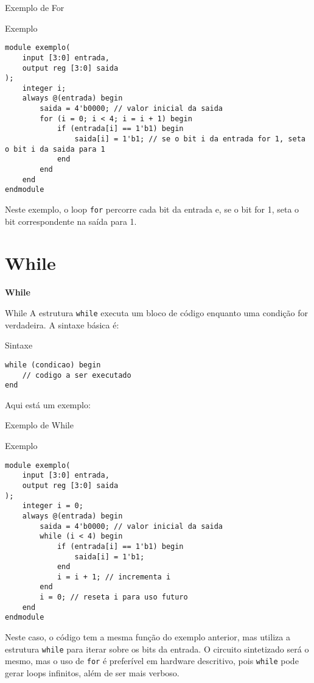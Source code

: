 \documentclass[aspectratio=169,xcolor=dvipsnames]{beamer}
\begin{document}
\begin{frame}[fragile]{Exemplo de For}
\begin{block}{Exemplo}
\begin{verbatim}
module exemplo(
    input [3:0] entrada,
    output reg [3:0] saida
);
    integer i;
    always @(entrada) begin
        saida = 4'b0000; // valor inicial da saida
        for (i = 0; i < 4; i = i + 1) begin
            if (entrada[i] == 1'b1) begin
                saida[i] = 1'b1; // se o bit i da entrada for 1, seta o bit i da saida para 1
            end
        end
    end
endmodule 
\end{verbatim}
\end{block}

Neste exemplo, o loop \texttt{for} percorre cada bit da entrada e, se o bit for 1, seta o bit correspondente na saída para 1.
\end{frame}

\section{While}

\begin{frame}
    \Huge{\centerline{\textbf{While}}}
\end{frame}

\begin{frame}[fragile]{While}
A estrutura \texttt{while} executa um bloco de código enquanto uma condição for verdadeira. A sintaxe básica é:

\begin{block}{Sintaxe}
\begin{verbatim}
while (condicao) begin
    // codigo a ser executado
end
\end{verbatim}
\end{block}

Aqui está um exemplo:
\end{frame}

\begin{frame}[fragile]{Exemplo de While}
\begin{block}{Exemplo}
\begin{verbatim}
module exemplo(
    input [3:0] entrada,
    output reg [3:0] saida
);
    integer i = 0;
    always @(entrada) begin
        saida = 4'b0000; // valor inicial da saida
        while (i < 4) begin
            if (entrada[i] == 1'b1) begin
                saida[i] = 1'b1;
            end
            i = i + 1; // incrementa i
        end
        i = 0; // reseta i para uso futuro
    end
endmodule
\end{verbatim}
\end{block}

Neste caso, o código tem a mesma função do exemplo anterior, mas utiliza a estrutura \texttt{while} para iterar sobre os bits da entrada. O circuito sintetizado será o mesmo, mas o uso de \texttt{for} é preferível em hardware descritivo, pois \texttt{while} pode gerar loops infinitos, além de ser mais verboso.
\end{frame}
\end{document}
